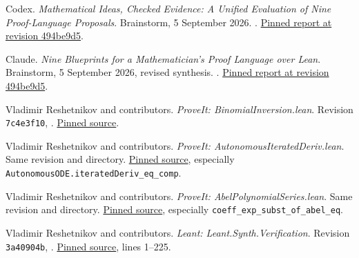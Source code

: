 \documentclass[11pt,letterpaper]{article}
\newcommand{\code}[1]{\nolinkurl{#1}}
\newcommand{\src}[2]{\href{#1}{#2}}
\numberwithin{equation}{section}
\begin{document}
\clearpage
\begin{thebibliography}{99}
\small\raggedright
{}

 Codex.
\emph{Mathematical Ideas, Checked Evidence: A Unified Evaluation of Nine
Proof-Language Proposals}. Brainstorm, 5 September 2026.
.
\src{https://github.com/VladimirReshetnikov/Brainstorm/blob/494be9d5ab41a5ae219fc6f800e6aee3c93bce39/docs/synthesis/unified-report.tex}{Pinned report at revision 494be9d5}.

 Claude.
\emph{Nine Blueprints for a Mathematician's Proof Language over Lean}.
Brainstorm, 5 September 2026, revised synthesis.
.
\src{https://github.com/VladimirReshetnikov/Brainstorm/blob/494be9d5ab41a5ae219fc6f800e6aee3c93bce39/docs/unified_report/unified_report.tex}{Pinned report at revision 494be9d5}.

 Vladimir Reshetnikov and contributors.
\emph{ProveIt: BinomialInversion.lean}. Revision \code{7c4e3f10},
.
\src{https://github.com/VladimirReshetnikov/ProveIt/blob/7c4e3f109405b9805b35d27ae96bf09c7ee5f3d5/Analysis/FabiusFunction/Lean/FabiusFunction/BinomialInversion.lean}{Pinned source}.

 Vladimir Reshetnikov and contributors.
\emph{ProveIt: AutonomousIteratedDeriv.lean}. Same revision and directory.
\src{https://github.com/VladimirReshetnikov/ProveIt/blob/7c4e3f109405b9805b35d27ae96bf09c7ee5f3d5/Analysis/FabiusFunction/Lean/FabiusFunction/AutonomousIteratedDeriv.lean}{Pinned source}, especially
\code{AutonomousODE.iteratedDeriv_eq_comp}.

 Vladimir Reshetnikov and contributors.
\emph{ProveIt: AbelPolynomialSeries.lean}. Same revision and directory.
\src{https://github.com/VladimirReshetnikov/ProveIt/blob/7c4e3f109405b9805b35d27ae96bf09c7ee5f3d5/Analysis/FabiusFunction/Lean/FabiusFunction/AbelPolynomialSeries.lean}{Pinned source}, especially
\code{coeff_exp_subst_of_abel_eq}.

 Vladimir Reshetnikov and contributors.
\emph{Leant: Leant.Synth.Verification}. Revision \code{3a40904b},
.
\src{https://github.com/VladimirReshetnikov/Leant/blob/3a40904be8a410d832d9ab6900b3d3e7b425eccb/src/Leant/Synth/Verification.hs}{Pinned source}, lines 1--225.


\end{thebibliography}
\end{document}
